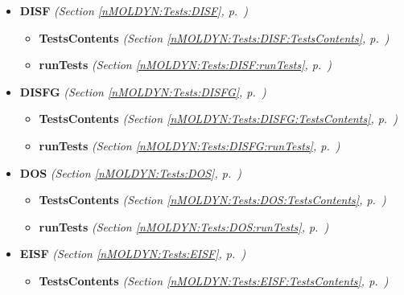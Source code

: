 \begin{itemize}
\begin{itemize}
  \end{itemize}
\item \textbf{DISF}
  \textit{(Section \ref{nMOLDYN:Tests:DISF}, p.~\pageref{nMOLDYN:Tests:DISF})}

  \begin{itemize}
\setlength{\parskip}{0ex}
    \item \textbf{TestsContents}
  \textit{(Section \ref{nMOLDYN:Tests:DISF:TestsContents}, p.~\pageref{nMOLDYN:Tests:DISF:TestsContents})}

    \item \textbf{runTests}
  \textit{(Section \ref{nMOLDYN:Tests:DISF:runTests}, p.~\pageref{nMOLDYN:Tests:DISF:runTests})}

  \end{itemize}
\item \textbf{DISFG}
  \textit{(Section \ref{nMOLDYN:Tests:DISFG}, p.~\pageref{nMOLDYN:Tests:DISFG})}

  \begin{itemize}
\setlength{\parskip}{0ex}
    \item \textbf{TestsContents}
  \textit{(Section \ref{nMOLDYN:Tests:DISFG:TestsContents}, p.~\pageref{nMOLDYN:Tests:DISFG:TestsContents})}

    \item \textbf{runTests}
  \textit{(Section \ref{nMOLDYN:Tests:DISFG:runTests}, p.~\pageref{nMOLDYN:Tests:DISFG:runTests})}

  \end{itemize}
\item \textbf{DOS}
  \textit{(Section \ref{nMOLDYN:Tests:DOS}, p.~\pageref{nMOLDYN:Tests:DOS})}

  \begin{itemize}
\setlength{\parskip}{0ex}
    \item \textbf{TestsContents}
  \textit{(Section \ref{nMOLDYN:Tests:DOS:TestsContents}, p.~\pageref{nMOLDYN:Tests:DOS:TestsContents})}

    \item \textbf{runTests}
  \textit{(Section \ref{nMOLDYN:Tests:DOS:runTests}, p.~\pageref{nMOLDYN:Tests:DOS:runTests})}

  \end{itemize}
\item \textbf{EISF}
  \textit{(Section \ref{nMOLDYN:Tests:EISF}, p.~\pageref{nMOLDYN:Tests:EISF})}

  \begin{itemize}
\setlength{\parskip}{0ex}
    \item \textbf{TestsContents}
  \textit{(Section \ref{nMOLDYN:Tests:EISF:TestsContents}, p.~\pageref{nMOLDYN:Tests:EISF:TestsContents})}


\end{itemize}
\end{itemize}
